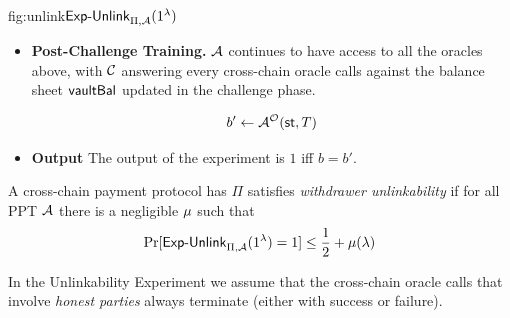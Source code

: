 \begin{ExpFig}{fig:unlink}{$\mathsf{Exp\text{-}Unlink}_{\Pi,\mathcal{A}}(1^{\lambda})$}
\begin{itemize}[leftmargin=1.4em,itemsep=3pt]
\begin{itemize}[nosep,leftmargin=1.4em]
  \item otherwise:
  \begin{enumerate}
      \item sample $b \gets \{0,1\}$;

      \item create a fresh  public-chain address $\destAddr^*$ and execute
      $$\Withdraw(\candB, \destAddr^*, \tokType, \amt, \auxx \,;\, \privIn_b) $$

   with the output  $$\stpub*',\ \stshd*',\ \trans^*, \outc^*$$ returned to $\Adv$.
  \item if $\outc^* =\succeeded$:\\ Update the balance state for both account:\\
  $\bal[\candZero][\tokType] \mathrel{-}= \amt$ \emph{and}
        $\bal[\candOne][\tokType] \mathrel{-}= \amt$; \\
        and use these amounts to simulate all the oracles \S~\ref{sec:crosschainoracles},\S~\ref{sec:ledgeroracles}.
    \item if $\outc =\failed$ balances are not updated.
  \end{enumerate}
    \end{itemize}
\item \textbf{Post-Challenge Training.} $\Adv$ continues to have access to all the  oracles above, with $\mathcal{C}$ answering every cross-chain oracle calls against the balance sheet $\mathsf{vaultBal}$ updated   in the challenge phase.


$$b' \gets \mathcal{A}^{\mathcal{O}}(\mathsf{st}, T)$$
\item \textbf{Output} The  output of the experiment is $1$ iff $b = b'$.
\end{itemize}
\end{ExpFig}

\begin{definition}
\label{def:unlink}
A cross-chain payment protocol has $\Pi$ satisfies \emph{withdrawer unlinkability} if for all PPT $\Adv$ there is a negligible $\mu$ such
that
$$\Pr[\mathsf{Exp\text{-}Unlink}_{\Pi,\mathcal{A}}(1^{\lambda}) = 1] \le \frac{1}{2} + \mu(\lambda)$$
\end{definition}


\begin{remark}
\label{rem:failpending}
In the Unlinkability Experiment  we assume that the cross-chain oracle calls that involve \emph{honest parties}  always terminate (either with success or failure).
\end{remark}


